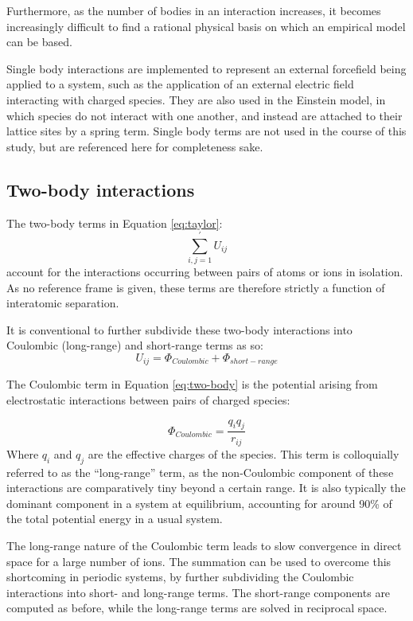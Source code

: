 Furthermore, as the number of bodies in an interaction increases, it becomes increasingly difficult to find a rational physical basis on which an empirical model can be based. 
 
Single body interactions are implemented to represent an external forcefield being applied to a system, such as the application of an external electric field interacting with charged species.
They are also used in the Einstein model, in which species do not interact with one another, and instead are attached to their lattice sites by a spring term.
Single body terms are not used in the course of this study, but are referenced here for completeness sake.

\newpage
\subsection{Two-body interactions}
The two-body terms in Equation \ref{eq:taylor}: $$\sum_{i,j = 1}^\prime U_{ij}$$ account for the interactions occurring between pairs of atoms or ions in isolation.
As no reference frame is given, these terms are therefore strictly a function of interatomic separation.

It is conventional to further subdivide these two-body interactions into Coulombic (long-range) and short-range terms as so:
\begin{equation}
U_{ij} = \Phi_{Coulombic} + \Phi_{short-range}
\label{eq:two-body}
\end{equation}

The Coulombic term in Equation \ref{eq:two-body} is the potential arising from electrostatic interactions between pairs of charged species:

\begin{equation}
\Phi_{Coulombic} = \frac{q_iq_j}{r_{ij}}
\label{eq:coulombic}
\end{equation}
Where $q_i$ and $q_j$ are the effective charges of the species.
This term is colloquially referred to as the ``long-range'' term, as the non-Coulombic component of these interactions are comparatively tiny beyond a certain range.
It is also typically the dominant component in a system at equilibrium, accounting for around 90\% of the total potential energy in a usual system.\cite{Catlow2013}

The long-range nature of the Coulombic term leads to slow convergence in direct space for a large number of ions.
The \citet{Ewald1921} summation can be used to overcome this shortcoming in periodic systems, by further subdividing the Coulombic interactions into short- and long-range terms.
The short-range components are computed as before, while the long-range terms are solved in reciprocal space.

